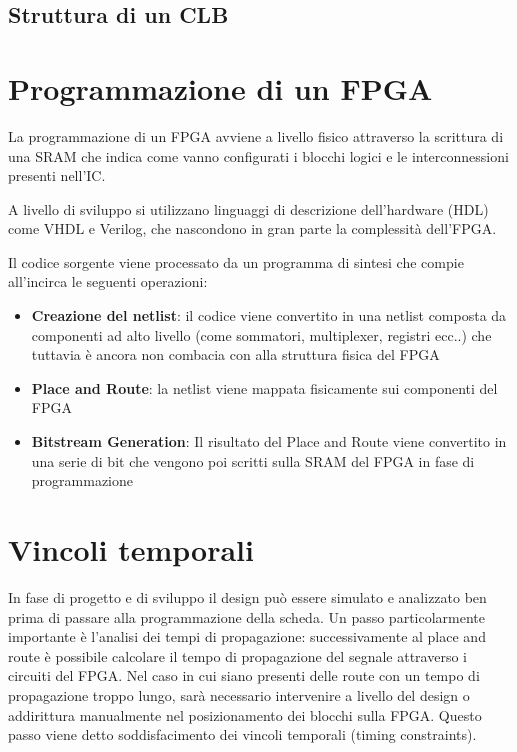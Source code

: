 \subsection{Struttura di un CLB}

\section{Programmazione di un FPGA}
La programmazione di un FPGA avviene a livello fisico attraverso
la scrittura di una SRAM che indica come vanno configurati i blocchi
logici e le interconnessioni presenti nell'IC.

A livello di sviluppo si utilizzano linguaggi di descrizione dell'hardware
(HDL) come VHDL e Verilog, che nascondono in gran parte la complessità
dell'FPGA.

Il codice sorgente viene processato da un programma di sintesi che compie
all'incirca le seguenti operazioni:

\begin{itemize}
    \item \textbf{Creazione del netlist}: il codice viene convertito in una
          netlist composta da componenti ad alto livello (come sommatori,
          multiplexer, registri ecc..) che tuttavia è ancora non combacia
          con alla struttura fisica del FPGA
    \item \textbf{Place and Route}: la netlist viene mappata fisicamente sui
          componenti del FPGA
    \item \textbf{Bitstream Generation}: Il risultato del Place and Route viene
          convertito in una serie di bit che vengono poi scritti sulla SRAM
          del FPGA in fase di programmazione
\end{itemize}

\section{Vincoli temporali}
In fase di progetto e di sviluppo il design può essere simulato e analizzato
ben prima di passare alla programmazione della scheda.
Un passo particolarmente importante è l'analisi dei tempi di propagazione:
successivamente al place and route è possibile calcolare il tempo di propagazione
del segnale attraverso i circuiti del FPGA. Nel caso in cui siano presenti
delle route con un tempo di propagazione troppo lungo, sarà necessario
intervenire a livello del design o addirittura manualmente nel posizionamento
dei blocchi sulla FPGA.
Questo passo viene detto soddisfacimento dei vincoli temporali (timing constraints).

